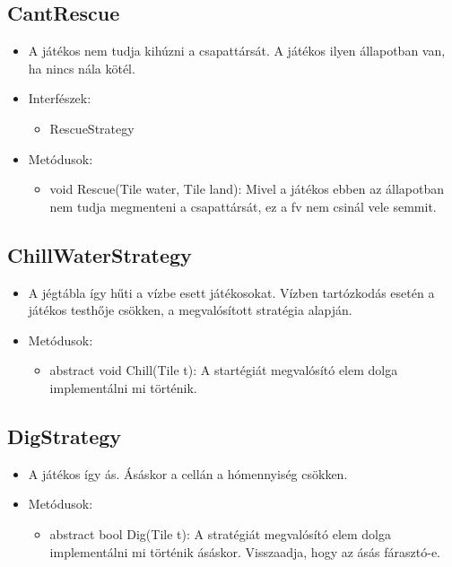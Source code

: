 \subsection{CantRescue}
\begin{itemize}
	\item A játékos nem tudja kihúzni a csapattársát. A játékos ilyen állapotban van, ha nincs nála kötél.
	\item Interfészek:
	\begin{itemize}
		\item RescueStrategy
	\end{itemize}
	\item Metódusok:
	\begin{itemize}
		\item void Rescue(Tile water, Tile land): Mivel a játékos ebben az állapotban nem tudja megmenteni a csapattársát, ez a fv nem csinál vele semmit. 
	\end{itemize}
\end{itemize}

\subsection{ChillWaterStrategy}
\begin{itemize}
	\item A jégtábla így hűti a vízbe esett játékosokat. Vízben tartózkodás esetén a játékos testhője csökken, a megvalósított stratégia alapján.
	\item Metódusok:
	\begin{itemize}
		\item abstract void Chill(Tile t): A startégiát megvalósító elem dolga implementálni mi történik.
	\end{itemize}
\end{itemize}

\subsection{DigStrategy}
\begin{itemize}
	\item A játékos így ás.	Ásáskor a cellán a hómennyiség csökken.
	\item Metódusok:
	\begin{itemize}
		\item abstract bool Dig(Tile t): A stratégiát megvalósító elem dolga implementálni mi történik ásáskor. Visszaadja, hogy az ásás fárasztó-e.
	\end{itemize}
\end{itemize}


